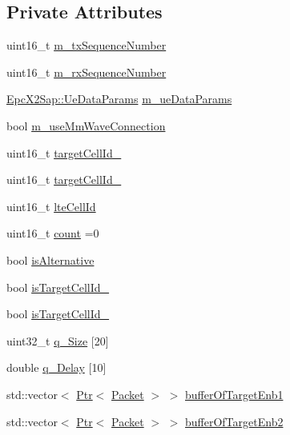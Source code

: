 \subsection*{Private Attributes}
\begin{DoxyCompactItemize}
\item 
uint16\+\_\+t \hyperlink{classns3_1_1McEnbPdcp_a6676f6c8dcf6b98eb9692549607473e7}{m\+\_\+tx\+Sequence\+Number}
\item 
uint16\+\_\+t \hyperlink{classns3_1_1McEnbPdcp_a90daa41419ecf2e8f45310bc6dc48ad8}{m\+\_\+rx\+Sequence\+Number}
\item 
\hyperlink{structns3_1_1EpcX2Sap_1_1UeDataParams}{Epc\+X2\+Sap\+::\+Ue\+Data\+Params} \hyperlink{classns3_1_1McEnbPdcp_a287dd059b2cafce7d6c4d4813ee79808}{m\+\_\+ue\+Data\+Params}
\item 
bool \hyperlink{classns3_1_1McEnbPdcp_a6cbdfb0b27f6ff6d16c1b5809df73613}{m\+\_\+use\+Mm\+Wave\+Connection}
\item 
uint16\+\_\+t \hyperlink{classns3_1_1McEnbPdcp_a543097504b40179c297529d19a07165d}{target\+Cell\+Id\+\_}
\item 
uint16\+\_\+t \hyperlink{classns3_1_1McEnbPdcp_a6dc7c7ba7f3f52242b52efd2aac0ac72}{target\+Cell\+Id\+\_}
\item 
uint16\+\_\+t \hyperlink{classns3_1_1McEnbPdcp_aca14fae296ce8719d9a007bb6dac8168}{lte\+Cell\+Id}
\item 
uint16\+\_\+t \hyperlink{classns3_1_1McEnbPdcp_abd1cb5ff8d1a5c8b5e3d241d1fbd5240}{count} =0
\item 
bool \hyperlink{classns3_1_1McEnbPdcp_a716461d57e7d4b966053e5cb3cfb0b15}{is\+Alternative}
\item 
bool \hyperlink{classns3_1_1McEnbPdcp_a4818eb96ddb258c26c51fd742d05bbcb}{is\+Target\+Cell\+Id\+\_}
\item 
bool \hyperlink{classns3_1_1McEnbPdcp_ad80426e5766f06381b6dd007c79c5f35}{is\+Target\+Cell\+Id\+\_}
\item 
uint32\+\_\+t \hyperlink{classns3_1_1McEnbPdcp_a4cdcc9f856842c0be744ae4f589413c2}{q\+\_\+\+Size} \mbox{[}20\mbox{]}
\item 
double \hyperlink{classns3_1_1McEnbPdcp_a30a6a039c211d3d31ff2a0cc56818c85}{q\+\_\+\+Delay} \mbox{[}10\mbox{]}
\item 
std\+::vector$<$ \hyperlink{classns3_1_1Ptr}{Ptr}$<$ \hyperlink{classns3_1_1Packet}{Packet} $>$ $>$ \hyperlink{classns3_1_1McEnbPdcp_a7418919c44f5c3aa473a040b5aeb2abc}{buffer\+Of\+Target\+Enb1}
\item 
std\+::vector$<$ \hyperlink{classns3_1_1Ptr}{Ptr}$<$ \hyperlink{classns3_1_1Packet}{Packet} $>$ $>$ \hyperlink{classns3_1_1McEnbPdcp_a36253cb41b4763b611e052d3c261c78c}{buffer\+Of\+Target\+Enb2}

\end{DoxyCompactItemize}
